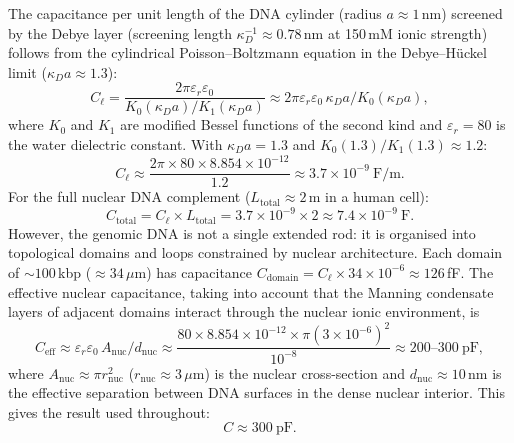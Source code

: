 The capacitance per unit length of the DNA cylinder (radius $a \approx 1$\,nm)
screened by the Debye layer (screening length $\kappa_D^{-1} \approx 0.78$\,nm
at 150\,mM ionic strength) follows from the cylindrical Poisson--Boltzmann
equation in the Debye--H\"{u}ckel limit ($\kappa_D a \approx 1.3$):
\begin{equation}
  C_\ell = \frac{2\pi\varepsilon_r\varepsilon_0}{K_0(\kappa_D a)/K_1(\kappa_D a)}
    \approx 2\pi\varepsilon_r\varepsilon_0\,\kappa_D a / K_0(\kappa_D a),
  \label{eq:capacitance_per_length}
\end{equation}
where $K_0$ and $K_1$ are modified Bessel functions of the second kind and
$\varepsilon_r = 80$ is the water dielectric constant.
With $\kappa_D a = 1.3$ and $K_0(1.3)/K_1(1.3) \approx 1.2$:
\begin{equation}
  C_\ell \approx \frac{2\pi \times 80 \times 8.854 \times 10^{-12}}{1.2}
    \approx 3.7 \times 10^{-9}\ \mathrm{F/m}.
  \label{eq:capacitance_per_length_value}
\end{equation}
For the full nuclear DNA complement ($L_{\mathrm{total}} \approx 2$\,m in a
human cell):
\begin{equation}
  C_{\mathrm{total}} = C_\ell \times L_{\mathrm{total}}
    = 3.7 \times 10^{-9} \times 2
    \approx 7.4 \times 10^{-9}\ \mathrm{F}.
  \label{eq:capacitance_total_raw}
\end{equation}
However, the genomic DNA is not a single extended rod: it is organised into
topological domains and loops constrained by nuclear architecture. Each domain
of $\sim 100$\,kbp ($\approx 34\,\mu$m) has capacitance
$C_{\mathrm{domain}} = C_\ell \times 34 \times 10^{-6} \approx 126$\,fF.
The effective nuclear capacitance, taking into account that the Manning
condensate layers of adjacent domains interact through the nuclear ionic
environment, is
\begin{equation}
  C_{\mathrm{eff}} \approx \varepsilon_r\varepsilon_0\,A_{\mathrm{nuc}} / d_{\mathrm{nuc}}
    \approx \frac{80 \times 8.854 \times 10^{-12} \times \pi(3\times10^{-6})^2}{10^{-8}}
    \approx 200\text{--}300\ \mathrm{pF},
  \label{eq:capacitance_effective}
\end{equation}
where $A_{\mathrm{nuc}} \approx \pi r_{\mathrm{nuc}}^2$ ($r_{\mathrm{nuc}} \approx 3\,\mu$m)
is the nuclear cross-section and $d_{\mathrm{nuc}} \approx 10$\,nm is the
effective separation between DNA surfaces in the dense nuclear interior.
This gives the result used throughout:
\begin{equation}
  \boxed{C \approx 300\ \mathrm{pF}.}
  \label{eq:capacitance}
\end{equation}

